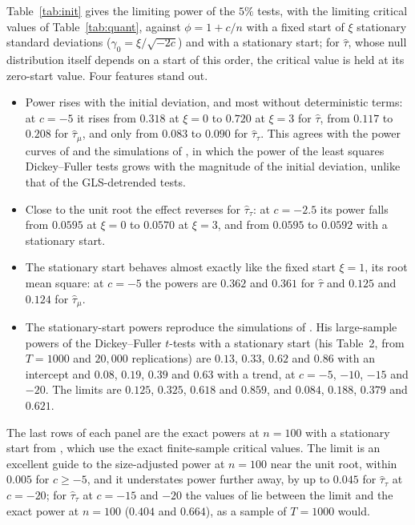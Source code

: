 \documentclass[ecta,nameyear,final]{econsocart}
\theoremstyle{plain}
\theoremstyle{definition}
\begin{document}
Table~\ref{tab:init} gives the limiting power of the $5\%$ tests, with the limiting critical values of Table~\ref{tab:quant}, against $\phi=1+c/n$ with a fixed start of $\xi$ stationary standard deviations ($\gamma_0=\xi/\sqrt{-2c}$) and with a stationary start; for $\hat\tau$, whose null distribution itself depends on a start of this order, the critical value is held at its zero-start value.  Four features stand out.
\begin{itemize}
\item Power rises with the initial deviation, and most without deterministic terms: at $c=-5$ it rises from $0.318$ at $\xi=0$ to $0.720$ at $\xi=3$ for $\hat\tau$, from $0.117$ to $0.208$ for $\hat\tau_\mu$, and only from $0.083$ to $0.090$ for $\hat\tau_\tau$.  This agrees with the power curves of \cite{MullerElliott2003} and the simulations of \cite{HarveyLeybourneTaylor2009}, in which the power of the least squares Dickey--Fuller tests grows with the magnitude of the initial deviation, unlike that of the GLS-detrended tests.
\item Close to the unit root the effect reverses for $\hat\tau_\tau$: at $c=-2.5$ its power falls from $0.0595$ at $\xi=0$ to $0.0570$ at $\xi=3$, and from $0.0595$ to $0.0592$ with a stationary start.
\item The stationary start behaves almost exactly like the fixed start $\xi=1$, its root mean square: at $c=-5$ the powers are $0.362$ and $0.361$ for $\hat\tau$ and $0.125$ and $0.124$ for $\hat\tau_\mu$.
\item The stationary-start powers reproduce the simulations of \cite{Elliott1999}.  His large-sample powers of the Dickey--Fuller $t$-tests with a stationary start (his Table~2, from $T=1000$ and $20{,}000$ replications) are $0.13$, $0.33$, $0.62$ and $0.86$ with an intercept and $0.08$, $0.19$, $0.39$ and $0.63$ with a trend, at $c=-5$, $-10$, $-15$ and $-20$.  The limits are $0.125$, $0.325$, $0.618$ and $0.859$, and $0.084$, $0.188$, $0.379$ and $0.621$.
\end{itemize}
The last rows of each panel are the exact powers at $n=100$ with a stationary start from \cite{BaoBrodaKan2026}, which use the exact finite-sample critical values.  The limit is an excellent guide to the size-adjusted power at $n=100$ near the unit root, within $0.005$ for $c\ge-5$, and it understates power further away, by up to $0.045$ for $\hat\tau_\tau$ at $c=-20$; for $\hat\tau_\tau$ at $c=-15$ and $-20$ the values of \cite{Elliott1999} lie between the limit and the exact power at $n=100$ ($0.404$ and $0.664$), as a sample of $T=1000$ would.
\end{document}
